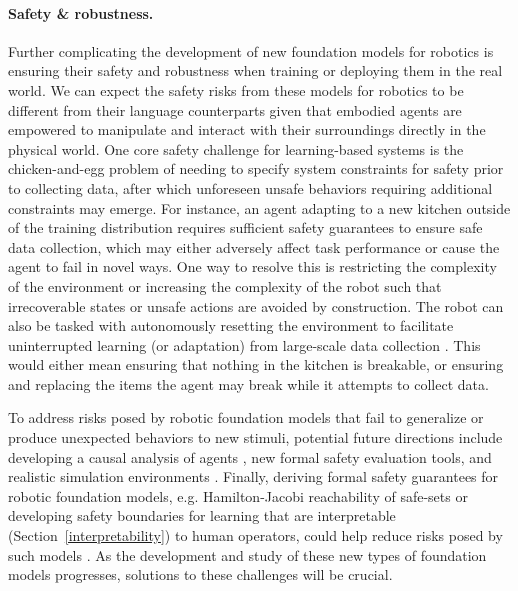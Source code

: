 \paragraph{Safety \& robustness.} Further complicating the development of new foundation models for robotics is ensuring their safety and robustness when training or deploying them in the real world. We can expect the safety risks from these models for robotics to be different from their language counterparts given that embodied agents are empowered to manipulate and interact with their surroundings directly in the physical world. One core safety challenge for learning-based systems is the chicken-and-egg problem of needing to specify system constraints for safety prior to collecting data, after which unforeseen unsafe behaviors requiring additional constraints may emerge. For instance, an agent adapting to a new kitchen outside of the training distribution requires sufficient safety guarantees to ensure safe data collection, which may either adversely affect task performance or cause the agent to fail in novel ways. One way to resolve this is restricting the complexity of the environment or increasing the complexity of the robot such that irrecoverable states or unsafe actions are avoided by construction. The robot can also be tasked with autonomously resetting the environment to facilitate uninterrupted learning (or adaptation) from large-scale data collection \citep{eysenbach2017leave, gupta2021reset}. This would either mean ensuring that nothing in the kitchen is breakable, or ensuring and replacing the items the agent may break while it attempts to collect data.

To address risks posed by robotic foundation models that fail to generalize or produce unexpected behaviors to new stimuli, potential future directions include developing a causal analysis of agents \citep{deletang2021causal}, new formal safety evaluation tools, and realistic simulation environments \citep{corso2020survey, dreossi2017compositional, Julian_2019}. Finally, deriving formal safety guarantees for robotic foundation models, e.g. Hamilton-Jacobi reachability of safe-sets \citep{chow2018lyapunov, fisac2019bridging, herbert2021scalable} or developing safety boundaries for learning that are interpretable (Section~\ref{interpretability}) to human operators, could help reduce risks posed by such models \citep{berkenkamp2017safe}. As the development and study of these new types of foundation models progresses, solutions to these challenges will be crucial.

